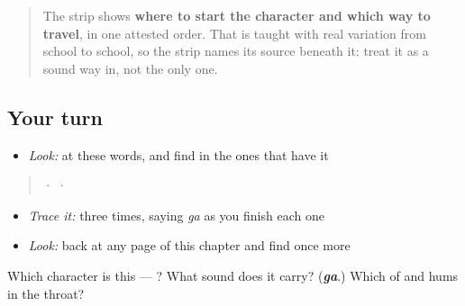 \begin{quote}
The strip shows \textbf{where to start the character and which way to travel}, in one attested order. That is taught with real variation from school to school, so the strip names its source beneath it: treat it as a sound way in, not the only one.
\end{quote}

\subsection*{Your turn}
\begin{itemize}
\raggedright
  \item \emph{Look:} at these words, and find  in the ones that have it
\end{itemize}

\begin{quote}
  ·    ·  
\end{quote}

\begin{itemize}
\raggedright
  \item \emph{Trace it:}  three times, saying \emph{ga} as you finish each one
  \item \emph{Look:} back at any page of this chapter and find  once more
\end{itemize}

\begin{tcolorbox}[breakable,colback=teal!4,colframe=teal!35!black,title={Before you move on}]
Which character is this — ? What sound does it carry? (\emph{\textbf{ga}}.) Which of  and  hums in the throat?
\end{tcolorbox}
